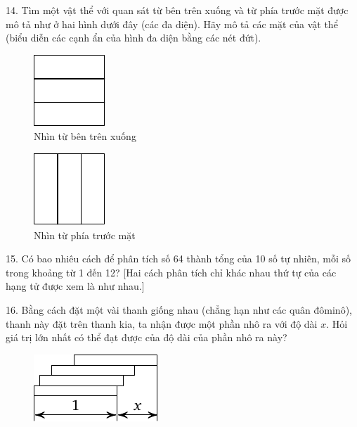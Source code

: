 \begin{problem}{14.}
	Tìm một vật thể với quan sát từ bên trên xuống và từ phía trước mặt được mô tả như ở hai hình dưới đây (các đa diện). Hãy mô tả các mặt của vật thể (biểu diễn các cạnh ẩn của hình đa diện bằng các nét đứt).
	\begin{figure}
		\footnotesize
		\null\hfill
		\parbox{0.2\linewidth}{\centering\includegraphics{taskbook-99}\\Nhìn từ bên trên xuống}
		\hfill
		\parbox{0.2\linewidth}{\centering\includegraphics{taskbook-98}\\Nhìn từ phía trước mặt }
		\hfill\null
	\end{figure}
\end{problem}

\begin{problem}{15.}
	Có bao nhiêu cách để phân tích số 64 thành tổng của 10 số tự nhiên, mỗi số trong khoảng từ 1 đến 12? [Hai cách phân tích chỉ khác nhau thứ tự của các hạng tử được xem là như nhau.]
\end{problem}

\begin{problem}{16.}
	Bằng cách đặt một vài thanh giống nhau (chẳng hạn như các quân đôminô), thanh này đặt trên thanh kia, ta nhận được một phần nhô ra với độ dài $x$. Hỏi giá trị lớn nhất có thể đạt được của độ dài của phần nhô ra này?
	\begin{figure}
		\includegraphics{taskbook-97}
	\end{figure}
\end{problem}

